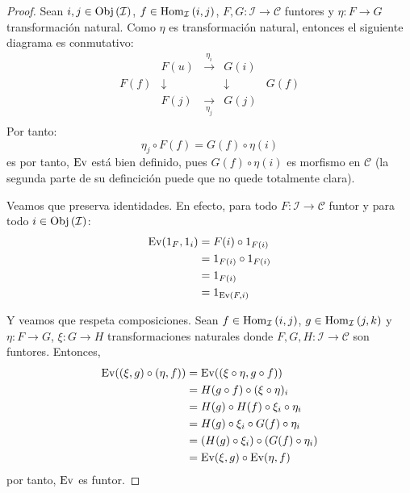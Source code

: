 \documentclass[12pt]{report}
\newcounter{it}
\theoremstyle{largebreak}
\newcommand\cf[3]{\ensuremath{#1:#2\rightarrow#3}}
\newcommand{\Obj}[1]{\ensuremath{\textup{Obj}\left(#1\right)}}
\newcommand{\Hom}[3]{\ensuremath{\textup{Hom}_{#1}\left(#2,#3\right)}}
\newcommand{\Ev}{\ensuremath{\textup{Ev}}}
\begin{document}
    \begin{proof}
        Sean $i,j\in\Obj{\mathcal{I}}$, $f\in\Hom{\mathcal{I}}{i}{j}$, $\cf{F,G}{\mathcal{I}}{\mathcal{C}}$ funtores y $\cf{\eta}{F}{G}$ transformación natural. Como $\eta$ es transformación natural, entonces el siguiente diagrama es conmutativo:
        \begin{equation*}
            \begin{array}{rcccl}
                &F(u) & \overset{\eta_i}{\longrightarrow} & G(i) &\\
                F(f) & \downarrow & & \downarrow & G(f) \\
                &F(j) & \underset{\eta_j}{\longrightarrow} & G(j) &\\
            \end{array}
        \end{equation*}
        Por tanto:
        \begin{equation*}
            \eta_j\circ F(f)=G(f)\circ\eta(i)
        \end{equation*}es
        por tanto, $\Ev$ está bien definido, pues $G(f)\circ\eta(i)$ es morfismo en $\mathcal{C}$ (la segunda parte de su defincición puede que no quede totalmente clara).

        Veamos que preserva identidades. En efecto, para todo $\cf{F}{\mathcal{I}}{\mathcal{C}}$ funtor y para todo $i\in\Obj{\mathcal{I}}$:
        \begin{equation*}
            \begin{split}
                \Ev(1_F,1_i)&=F(i)\circ 1_{F(i)}\\
                &=1_{F(i)}\circ 1_{F(i)}\\
                &=1_{F(i)}\\
                &=1_{\Ev(F,i)}\\
            \end{split}
        \end{equation*}
    
        Y veamos que respeta composiciones. Sean $f\in\Hom{\mathcal{I}}{i}{j}$, $g\in\Hom{\mathcal{I}}{j}{k}$ y $\cf{\eta}{F}{G}$, $\cf{\xi}{G}{H}$ transformaciones naturales donde $\cf{F,G,H}{\mathcal{I}}{\mathcal{C}}$ son funtores. Entonces,
        \begin{equation*}
            \begin{split}
                \Ev((\xi,g)\circ(\eta,f))&=\Ev((\xi\circ\eta,g\circ f))\\
                &=H(g\circ f)\circ(\xi\circ\eta)_i\\
                &=H(g)\circ H(f)\circ\xi_i\circ\eta_i\\
                &=H(g)\circ\xi_i\circ G(f)\circ\eta_i\\
                &=(H(g)\circ\xi_i)\circ (G(f)\circ\eta_i)\\
                &=\Ev(\xi,g)\circ\Ev(\eta,f)\\
            \end{split}
        \end{equation*}
        por tanto, $\Ev$ es funtor.
    \end{proof}
\end{document}
